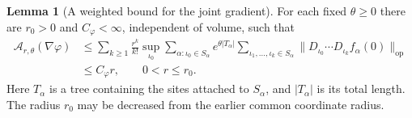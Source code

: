 \documentclass[10pt,reqno]{amsart}
\theoremstyle{definition}
\newtheorem{lemma}[definition]{Lemma}
\theoremstyle{remark}
\numberwithin{equation}{section}
\numberwithin{figure}{section}
\begin{document}
\begin{lemma}[A weighted bound for the joint gradient]\label{lem:local-analytic-gradient}
For each fixed $\theta\ge0$ there are $r_0>0$ and
$C_\varphi<\infty$, independent of volume, such that
\begin{equation}\label{eq:joint-gradient-local-analytic-bound}
\begin{aligned}
\mathcal A_{r,\theta}(\nabla\varphi)
&\le\sum_{k\ge1}\frac{r^k}{k!}\sup_{\iota_0}
\sum_{\alpha:\iota_0\in S_\alpha}e^{\theta|T_\alpha|}
\sum_{\iota_1,\ldots,\iota_k\in S_\alpha}
\|D_{\iota_0}\cdots D_{\iota_k}f_\alpha(0)\|_{\mathrm{op}}\\
&\le C_\varphi r,\qquad 0<r\le r_0.
\end{aligned}
\end{equation}
Here $T_\alpha$ is a tree containing the sites attached to
$S_\alpha$, and $|T_\alpha|$ is its total length. The radius $r_0$
may be decreased from the earlier common coordinate radius.
\end{lemma}
\end{document}
